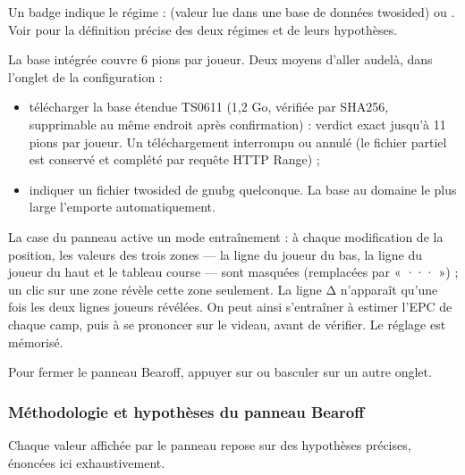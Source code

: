 \documentclass[letterpaper,10pt,french]{sphinxmanual}
\begin{document}
\sphinxAtStartPar
Un badge indique le régime :  (valeur lue dans une base de données
two\sphinxhyphen{}sided) ou . Voir {\hyperref[\detokenize{manuel:epc-methodologie}]{}} pour la
définition précise des deux régimes et de leurs hypothèses.

\sphinxAtStartPar
{} La base intégrée couvre 6 pions par joueur.
Deux moyens d’aller au\sphinxhyphen{}delà, dans l’onglet  de la configuration :
\begin{itemize}
\item {} 
\sphinxAtStartPar
télécharger la base étendue TS\sphinxhyphen{}06\sphinxhyphen{}11 (1,2 Go, vérifiée par SHA\sphinxhyphen{}256,
supprimable au même endroit après confirmation) : verdict exact jusqu’à
11 pions par joueur. Un téléchargement interrompu ou annulé  (le fichier partiel est conservé et complété par
requête HTTP Range) ;

\item {} 
\sphinxAtStartPar
indiquer un fichier  two\sphinxhyphen{}sided de gnubg quelconque. La base au
domaine le plus large l’emporte automatiquement.

\end{itemize}

\sphinxAtStartPar
{} La case  du panneau active un mode entraînement : à
chaque modification de la position, les valeurs des trois zones — la ligne
du joueur du bas, la ligne du joueur du haut et le tableau course — sont
masquées (remplacées par « ··· ») ; un clic sur une zone révèle cette zone
seulement. La ligne Δ n’apparaît qu’une fois les deux lignes joueurs
révélées. On peut ainsi s’entraîner à estimer l’EPC de chaque camp, puis à
se prononcer sur le videau, avant de vérifier. Le réglage est mémorisé.

\sphinxAtStartPar
Pour fermer le panneau Bearoff, appuyer sur  ou basculer sur un autre onglet.


\subsubsection{Méthodologie et hypothèses du panneau Bearoff}
\label{\detokenize{manuel:methodologie-et-hypotheses-du-panneau-bearoff}}\label{\detokenize{manuel:epc-methodologie}}
\sphinxAtStartPar
Chaque valeur affichée par le panneau repose sur des hypothèses précises,
énoncées ici exhaustivement.
\end{document}
